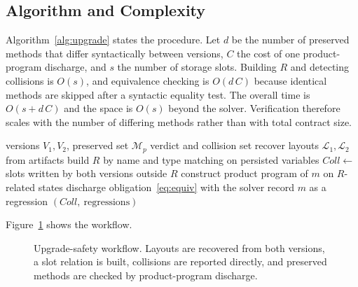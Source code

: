 \documentclass[journal]{IEEEtran}
\begin{document}
\subsection{Algorithm and Complexity}
Algorithm~\ref{alg:upgrade} states the procedure. Let $d$ be the number of preserved methods that differ syntactically between versions, $C$ the cost of one product-program discharge, and $s$ the number of storage slots. Building $R$ and detecting collisions is $O(s)$, and equivalence checking is $O(d\,C)$ because identical methods are skipped after a syntactic equality test. The overall time is $O(s + d\,C)$ and the space is $O(s)$ beyond the solver. Verification therefore scales with the number of differing methods rather than with total contract size.

\begin{algorithm}[t]
\caption{Upgrade-safety certification}
\label{alg:upgrade}
\begin{algorithmic}[1]
\Require versions $V_1,V_2$, preserved set $\mathcal{M}_p$
\Ensure verdict and collision set
\State recover layouts $\mathcal{L}_1,\mathcal{L}_2$ from artifacts
\State build $R$ by name and type matching on persisted variables
\State $\mathit{Coll} \gets$ slots written by both versions outside $R$
    \State construct product program of $m$ on $R$-related states
    \State discharge obligation~\eqref{eq:equiv} with the solver
     \State record $m$ as a regression \EndIf
  \EndIf
\EndFor
\State \Return $(\mathit{Coll},\ \text{regressions})$
\end{algorithmic}
\end{algorithm}

Figure~\ref{fig:pipeline} shows the workflow.

\begin{figure}[t]
\centering
{}
\caption{Upgrade-safety workflow. Layouts are recovered from both versions, a slot relation is built, collisions are reported directly, and preserved methods are checked by product-program discharge.}
\label{fig:pipeline}
\end{figure}
\end{document}
